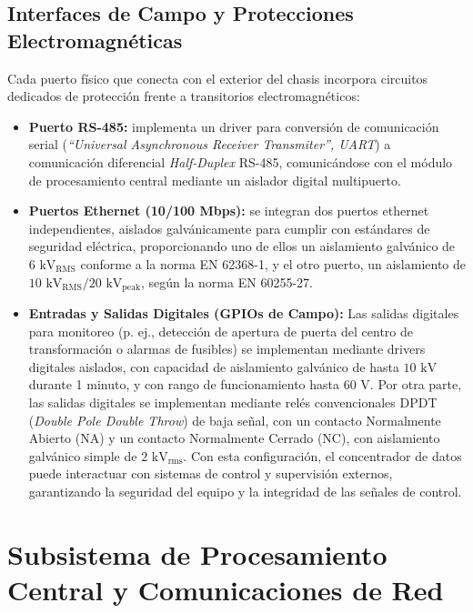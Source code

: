 \subsection{Interfaces de Campo y Protecciones Electromagnéticas}
\label{subsec:interfaces_protecciones}

Cada puerto físico que conecta con el exterior del chasis incorpora circuitos dedicados de protección frente a transitorios electromagnéticos:
\begin{itemize}
    \item \textbf{Puerto RS-485:} implementa un driver para conversión de comunicación serial (\textit{``Universal Asynchronous Receiver Transmiter'', UART}) a comunicación diferencial \textit{Half-Duplex} RS-485, comunicándose con el módulo de procesamiento central mediante un aislador digital multipuerto.
        
    \item \textbf{Puertos Ethernet (10/100 Mbps):} se integran dos puertos ethernet independientes, aislados galvánicamente para cumplir con estándares de seguridad eléctrica, proporcionando uno de ellos un aislamiento galvánico de $6\text{ kV}_{\text{RMS}}$ conforme a la norma EN 62368-1, y el otro puerto, un aislamiento de $10\text{ kV}_{\text{RMS}}/20\text{ kV}_{\text{peak}}$, según la norma EN 60255-27.
        
    \item \textbf{Entradas y Salidas Digitales (GPIOs de Campo):} Las salidas digitales para monitoreo (p. ej., detección de apertura de puerta del centro de transformación o alarmas de fusibles) se implementan mediante drivers digitales aislados, con capacidad de aislamiento galvánico de hasta $10 \text{ kV}$ durante 1 minuto, y con rango de funcionamiento hasta $60 \text{ V}$. Por otra parte, las salidas digitales se implementan mediante relés convencionales DPDT (\textit{Double Pole Double Throw}) de baja señal, con un contacto Normalmente Abierto (NA) y un contacto Normalmente Cerrado (NC), con aislamiento galvánico simple de $2 \text{ kV}_\text{rms}$. Con esta configuración, el concentrador de datos puede interactuar con sistemas de control y supervisión externos, garantizando la seguridad del equipo y la integridad de las señales de control. 

\end{itemize}

\section{Subsistema de Procesamiento Central y Comunicaciones de Red}
\label{sec:procesamiento_central}


